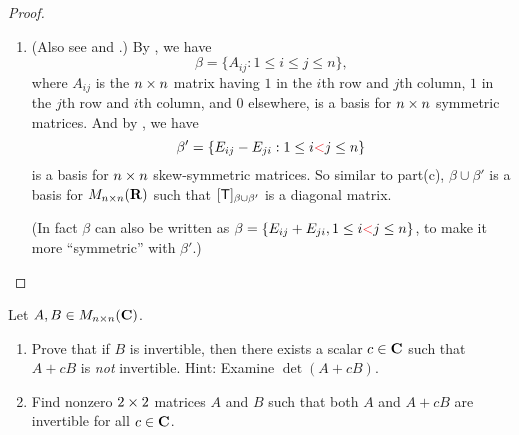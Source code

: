 \begin{proof}
\begin{enumerate}
\item
(Also see  and .)
By , we have
\[
    \beta = \{ A_{ij} : 1 \le i \le j \le n \},
\]
where \(A_{ij}\) is the \(n \times n\) matrix having \(1\) in the \(i\)th row and \(j\)th column, \(1\) in the \(j\)th row and \(i\)th column, and \(0\) elsewhere, is a basis for \(n \times n\) symmetric matrices.
And by , we have
\[
    \beta' = \{ E_{ij} - E_{ji} : 1 \le i \RED{ < } j \le n \}
\]
is a basis for \(n \times n\) skew-symmetric matrices.
So similar to part(c), \(\beta \cup \beta'\) is a basis for \(M_{n \times n}(\mathbf{R})\) such that \([\textsf{T}]_{\beta \cup \beta'}\) is a diagonal matrix.

(In fact \(\beta\) can also be written as \(\beta = \{ E_{ij} + E_{ji}, 1 \le i \RED{ < } j \le n \}\), to make it more ``symmetric'' with \(\beta'\).)
\end{enumerate}
\end{proof}

\begin{exercise} \label{exercise 5.1.19}
Let \(A, B \in M_{n \times n}(\mathbf{C})\).
\begin{enumerate}
\item Prove that if \(B\) is invertible, then there exists a scalar \(c \in \mathbf{C}\) such that \(A + cB\) is \emph{not} invertible.
Hint: Examine \(\det(A + cB)\).
\item Find nonzero \(2 \times 2\) matrices \(A\) and \(B\) such that both \(A\) and \(A + cB\) are invertible for all \(c \in \mathbf{C}\).
\end{enumerate}
\end{exercise}

